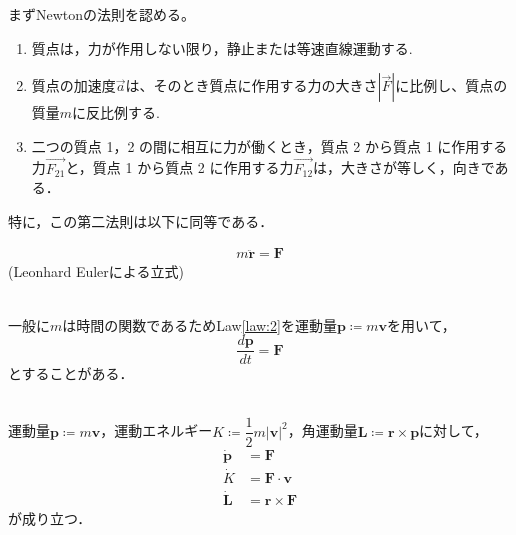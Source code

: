 \documentclass[dvipdfmx,uplatex]{jsarticle}
\begin{document}
まずNewtonの法則を認める。
\begin{law}\mbox{}
\begin{enumerate}
\item 質点は，力が作用しない限り，静止または等速直線運動する.
\item 質点の加速度$\overrightarrow{a}$は、そのとき質点に作用する力の大きさ$\left|{\overrightarrow{F}}\right|$に比例し、質点の質量$m$に反比例する.
\item 二つの質点 1，2 の間に相互に力が働くとき，質点 2 から質点 1 に作用する力$\overrightarrow{F_{21}}$と，質点 1 から質点 2 に作用する力$\overrightarrow{F_{12}}$は，大きさが等しく，向きである．
\end{enumerate}
\end{law}
特に，この第二法則は以下に同等である．
\begin{law}[第2法則の言い換え]\label{law:2}

\begin{align}
m \ddot{\bm{r}} = \bm{F} \label{equation-of-motion}
\end{align}
(Leonhard Eulerによる立式)
\end{law}

\begin{cf}\label{cf:1.3}\mbox{}\\
  一般に$m$は時間の関数であるため\rm{Law}\ref{law:2}を運動量$\bm{p} \coloneqq m \bm{v}$を用いて，
  \begin{equation*}
    \frac{d\bm{p}}{dt} = \bm{F}
  \end{equation*}
  とすることがある．
\end{cf}

\begin{theo}\mbox{}\\
  運動量$\bm{p} \coloneqq m \bm{v}$，運動エネルギー$K \coloneqq \dfrac{1}{2} m |\bm{v}|^2$，角運動量$\bm{L} \coloneqq \bm{r} \times \bm{p}$に対して，
  \begin{align}
    \bm{\dot{p}} &= \bm{F} \label{eq:1.2}\\
    \dot{K} &= \bm{F} \cdot \bm{v} \label{eq:1.3} \\
    \bm{\dot{L}} &= \bm{r} \times \bm{F} \label{eq:1.4}
  \end{align}
  が成り立つ．
\end{theo}
\end{document}
